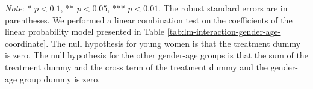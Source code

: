 \documentclass[12pt, a4paper]{article}
\begin{document}
\begin{table}[H]
\begin{threeparttable}
\begin{tablenotes}
\item \emph{Note}: * $p < 0.1$, ** $p < 0.05$, *** $p < 0.01$. The robust standard errors are in parentheses. We performed a linear combination test on the coefficients of the linear probability model presented in Table \ref{tab:lm-interaction-gender-age-coordinate}. The null hypothesis for young women is that the treatment dummy is zero. The null hypothesis for the other gender-age groups is that the sum of the treatment dummy and the cross term of the treatment dummy and the gender-age group dummy is zero.
\end{tablenotes}
\end{threeparttable}
\end{table}

\clearpage


\end{document}
